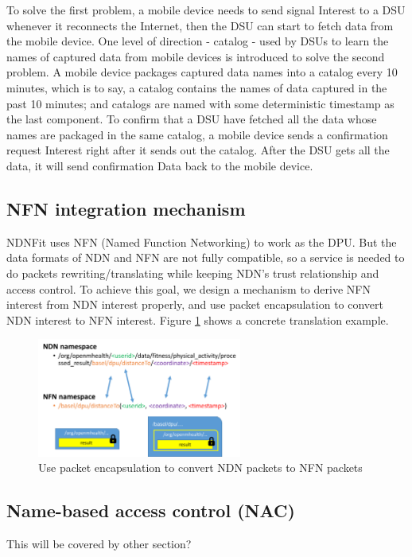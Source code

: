 \documentclass{article}
\begin{document}
To solve the first problem, a mobile device needs to send signal Interest to a DSU whenever it reconnects the Internet, then the DSU can start to fetch data from the mobile device.  One level of direction - catalog - used by DSUs to learn the names of captured data from mobile devices is introduced to solve the second problem. A mobile device packages captured data names into a catalog every 10 minutes, which is to say, a catalog contains the names of data captured in the past 10 minutes; and catalogs are named with some deterministic timestamp as the last component. To confirm that a DSU have fetched all the data whose names are packaged in the same catalog, a mobile device sends a confirmation request Interest right after it sends out the catalog. After the DSU gets all the data, it will send confirmation Data back to the mobile device. 

\subsection{NFN integration mechanism}
NDNFit uses NFN (Named Function Networking) to work as the DPU. But the data formats of NDN and NFN are not fully compatible, so a service is needed to do packets rewriting/translating while keeping NDN’s trust relationship and access control. To achieve this goal, we design a mechanism to derive NFN interest from NDN interest properly, and use packet encapsulation to convert NDN interest to NFN interest. Figure \ref{fig:ndnnfn} shows a concrete translation example.

\begin{figure}
	\begin{center}
		\includegraphics[width=0.6\textwidth]{ndnnfn.png}
		\caption{Use packet encapsulation to convert NDN packets to NFN packets}
		\label{fig:ndnnfn}
	\end{center}
\end{figure}

\subsection{Name-based access control (NAC)}
This will be covered by other section?
\end{document}
